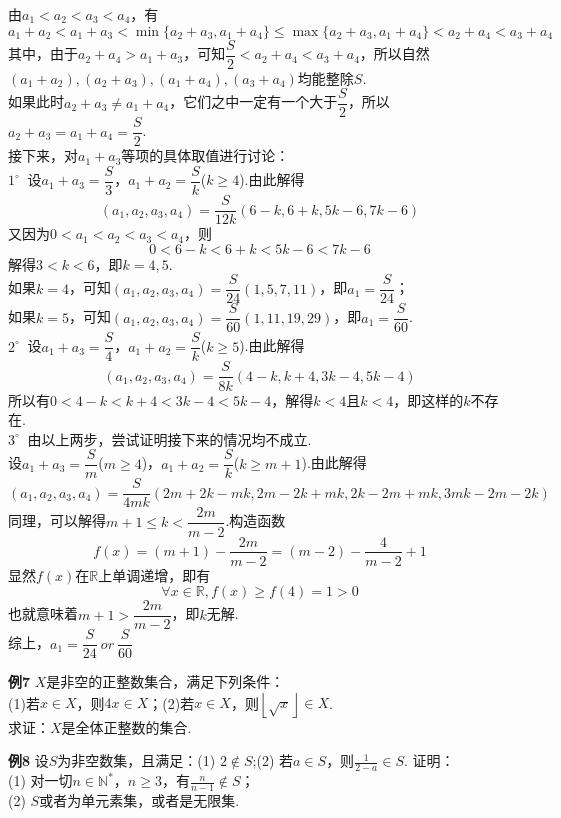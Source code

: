 \documentclass[lang=cn, zihao=4.5]{elegantbook}
\newcommand{\buzhou}[1]{$#1^{\circ} \ $}
\newcommand{\R}{\mathbb{R}}
\begin{document}
\begin{solution}
	由$a_1<a_2<a_3<a_4$，有$$a_1+a_2 < a_1+a_3 < \min \{ a_2+a_3,a_1+a_4 \} \leq \max \{ a_2+a_3,a_1+a_4 \} < a_2+a_4 < a_3+a_4$$
	其中，由于$a_2+a_4 > a_1+a_3$，可知$\dfrac{S}{2} < a_2+a_4 < a_3+a_4$，所以自然$(a_1+a_2),(a_2+a_3),(a_1+a_4),(a_3+a_4)$均能整除$S$. \\
	如果此时$a_2+a_3 \neq a_1+a_4$，它们之中一定有一个大于$\dfrac{S}{2}$，所以$a_2+a_3 = a_1+a_4 = \dfrac{S}{2}$. \\
	接下来，对$a_1+a_3$等项的具体取值进行讨论：\\
	\buzhou{1} 设$a_1+a_3 = \dfrac{S}{3}$，$a_1+a_2 = \dfrac{S}{k}$($k \geq 4$).由此解得$$(a_1,a_2,a_3,a_4) = \frac{S}{12k} (6-k,6+k,5k-6,7k-6)$$
	又因为$0<a_1<a_2<a_3<a_4$，则$$0 < 6-k < 6+k < 5k-6 < 7k-6$$
	解得$3 < k < 6$，即$k=4,5$. \\
	如果$k=4$，可知$(a_1,a_2,a_3,a_4) = \dfrac{S}{24} (1,5,7,11)$，即$a_1=\dfrac{S}{24}$； \\
	如果$k=5$，可知$(a_1,a_2,a_3,a_4) = \dfrac{S}{60} (1,11,19,29)$，即$a_1=\dfrac{S}{60}$. \\
	\buzhou{2} 设$a_1+a_3 = \dfrac{S}{4}$，$a_1+a_2 = \dfrac{S}{k}$($k \geq 5$).由此解得$$(a_1,a_2,a_3,a_4) = \frac{S}{8k} (4-k,k+4,3k-4,5k-4)$$
	所以有$0 < 4-k < k+4 < 3k-4 < 5k-4$，解得$k<4$且$k<4$，即这样的$k$不存在. \\
	\buzhou{3} 由以上两步，尝试证明接下来的情况均不成立. \\
	设$a_1+a_3 = \dfrac{S}{m}$($m \geq 4$)，$a_1+a_2 = \dfrac{S}{k}$($k \geq m+1$).由此解得$$(a_1,a_2,a_3,a_4) = \frac{S}{4mk} (2m+2k-mk,2m-2k+mk,2k-2m+mk,3mk-2m-2k)$$
	同理，可以解得$m+1 \leq k < \dfrac{2m}{m-2}$.构造函数$$f(x) = (m+1) - \frac{2m}{m-2} = (m-2) - \frac{4}{m-2} + 1$$
	显然$f(x)$在$\R$上单调递增，即有$$\forall x \in \R, f(x) \geq f(4) = 1 > 0$$
	也就意味着$m+1 > \dfrac{2m}{m-2}$，即$k$无解. \\
	综上，$a_1=\dfrac{S}{24} \ or \ \dfrac{S}{60}$
\end{solution}

\newpage
\noindent %
	\textbf{例7} \quad $X$是非空的正整数集合，满足下列条件：\\
	(1)若$x \in X$，则$4x \in X$；(2)若$x \in X$，则$\left \lfloor \sqrt{x} \right \rfloor  \in X$. \\
	求证：$X$是全体正整数的集合.
    
\newpage
\noindent %
	\textbf{例8} \quad 设$S$为非空数集，且满足：(1) $2 \notin S$;(2) 若$a \in S$，则$\frac{1}{2-a} \in S$. 证明：\\
    (1) 对一切$n \in \mathbb{N}^*$，$n \geq 3$，有$\frac{n}{n-1} \notin S$；\\
    (2) $S$或者为单元素集，或者是无限集.
    
\end{document}
